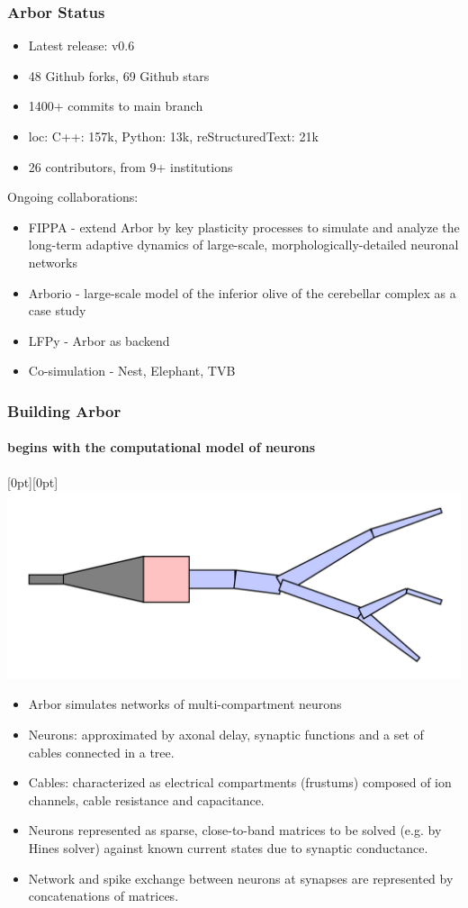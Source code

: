 \documentclass[t]{beamer}
\newcommand{\lenitem}[2][.6\linewidth]{\parbox[t]{#1}{\strut #2\strut}}
\begin{document}
\begin{frame}
    \frametitle{Arbor Status}

    \begin{itemize}
        \item Latest release: v0.6
        \item 48 Github forks, 69 Github stars
        \item 1400+ commits to main branch
        \item loc: C++: 157k, Python: 13k, reStructuredText: 21k
        \item 26 contributors, from 9+ institutions
    \end{itemize}

    Ongoing collaborations:
    \begin{itemize}
    \item FIPPA - extend Arbor by key plasticity processes to simulate and analyze the long-term adaptive dynamics of large-scale, morphologically-detailed neuronal networks
    \item Arborio - large-scale model of the inferior olive of the cerebellar complex as a case study
    \item LFPy - Arbor as backend
    \item Co-simulation - Nest, Elephant, TVB
    \end{itemize}

\end{frame}

\begin{frame}
    \frametitle{Building Arbor}
    \framesubtitle{begins with the computational model of neurons}

    \mbox{}\hfill\raisebox{-\height}[0pt][0pt]{\includegraphics[width=.35\linewidth]{cell.pdf}}
    \vspace*{-\baselineskip}

    \begin{itemize}
    \item \lenitem{Arbor simulates networks of multi-compartment neurons}
    \item \lenitem{Neurons: approximated by axonal delay, synaptic functions and a set of cables connected in a tree.}
    \item Cables: characterized as electrical compartments (frustums) composed of ion channels, cable resistance and capacitance.
    \item Neurons represented as sparse, close-to-band matrices to be solved (e.g. by Hines solver) against known current states due to synaptic conductance.
    \item Network and spike exchange between neurons at synapses are represented by concatenations of matrices.
    \end{itemize}

\end{frame}
\end{document}
